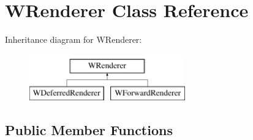 \hypertarget{class_w_renderer}{}\section{W\+Renderer Class Reference}
\label{class_w_renderer}
Inheritance diagram for W\+Renderer\+:\begin{figure}[H]
\begin{center}
\leavevmode
\includegraphics[height=2.000000cm]{class_w_renderer}
\end{center}
\end{figure}
\subsection*{Public Member Functions}
